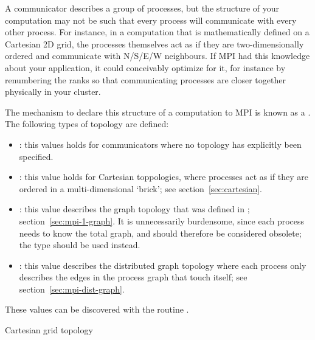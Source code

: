 
A communicator describes a group of processes, but the structure of
your computation may not be such that every process will communicate
with every other process. For instance, in a computation that is
mathematically defined on a
Cartesian 2D grid, the
processes themselves act as if they are two-dimensionally ordered and communicate
with N/S/E/W neighbours. If MPI had this knowledge about your
application, it could conceivably optimize for it, for instance by
renumbering the ranks so that communicating processes are closer
together physically in your cluster.

The mechanism to declare this structure of a computation to MPI
is known as a . The following types of
topology are defined:
\begin{itemize}
\item {}: this values holds for communicators where no
  topology has explicitly been specified.
\item {}: this value holds for Cartesian
  toppologies, where processes act as if they are ordered in a
  multi-dimensional `brick'; see
  section~\ref{sec:cartesian}.
\item {}: this value describes the graph
  topology that was defined in ;
  section~\ref{sec:mpi-1-graph}. It is unnecessarily burdensome, since
  each process needs to know the total graph, and should therefore be
  considered obsolete; the type  should
  be used instead.
\item {}: this value describes the distributed graph
  topology where each process only describes the edges in the process
  graph that touch itself; see section~\ref{sec:mpi-dist-graph}.
\end{itemize}
These values can be discovered with the routine
.

 {Cartesian grid topology}
\label{sec:cartesian}

